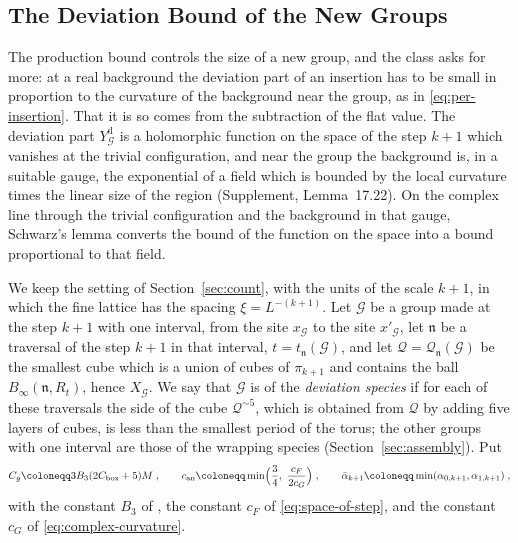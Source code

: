 \documentclass[11pt]{preprint}
\numberwithin{equation}{section}
\theoremstyle{definition}
\theoremstyle{remark}
\theoremstyle{plain}
\begin{document}
\subsection{The Deviation Bound of the New Groups}\label{sec:new-deviation}

The production bound controls the size of a new group, and the class asks for more: at a real background the deviation part of an insertion has to be small in proportion to the curvature of the background near the group, as in \eqref{eq:per-insertion}. That it is so comes from the subtraction of the flat value. The deviation part $Y^{\mathrm d}_{\mathcal G}$ is a holomorphic function on the space of the step $k + 1$ which vanishes at the trivial configuration, and near the group the background is, in a suitable gauge, the exponential of a field which is bounded by the local curvature times the linear size of the region (Supplement, Lemma~17.22). On the complex line through the trivial configuration and the background in that gauge, Schwarz's lemma converts the bound of the function on the space into a bound proportional to that field.

We keep the setting of Section~\ref{sec:count}, with the units of the scale $k + 1$, in which the fine lattice has the spacing $\xi = L^{-(k+1)}$. Let $\mathcal G$ be a group made at the step $k + 1$ with one interval, from the site $x_{\mathcal G}$ to the site $x'_{\mathcal G}$, let $\mathfrak n$ be a traversal of the step $k + 1$ in that interval, $t = t_{\mathfrak n}(\mathcal G)$, and let $\mathcal Q = \mathcal Q_{\mathfrak n}(\mathcal G)$ be the smallest cube which is a union of cubes of $\pi_{k+1}$ and contains the ball $B_\infty(\mathfrak n, R_t)$, hence $X_{\mathcal G}$. We say that $\mathcal G$ is of the \emph{deviation species} if for each of these traversals the side of the cube $\mathcal Q^{\sim 5}$, which is obtained from $\mathcal Q$ by adding five layers of cubes, is less than the smallest period of the torus; the other groups with one interval are those of the wrapping species (Section~\ref{sec:assembly}). Put
\begin{equation}\label{eq:cauchy-constants}
    C_g \coloneqq 3B_3(2C_{\mathrm{box}} + 5)M\;,
    \qquad
    c_{\mathrm{an}} \coloneqq \min\Bigl(\frac34,\ \frac{c_F}{2c_G}\Bigr)\;,
    \qquad
    \bar\alpha_{k+1} \coloneqq \min(\alpha_{0,k+1}, \alpha_{1,k+1})\;,
\end{equation}
with the constant $B_3$ of \cite[Theorem~1, p.~279]{BalabanVAR}, the constant $c_F$ of \eqref{eq:space-of-step}, and the constant $c_G$ of \eqref{eq:complex-curvature}.
\end{document}
